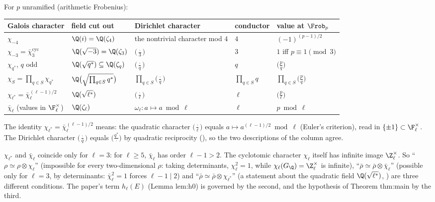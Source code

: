 \begin{example}\label{ex:ant:characters}
For $p$ unramified (arithmetic Frobenius):
\begin{center}\footnotesize\setlength{\tabcolsep}{3pt}
\begin{tabular}{lllll}
\toprule
Galois character & field cut out & Dirichlet character & conductor & value at $\Frob_p$\\
\midrule
$\chi_{-4}$ & $\Q(i)=\Q(\zeta_4)$ & the nontrivial character mod $4$ & $4$ & $(-1)^{(p-1)/2}$\\
$\chi_{-3}=\bar\chi_3^{\mathrm{cyc}}$ & $\Q(\sqrt{-3})=\Q(\zeta_3)$ & $\bigl(\frac\cdot3\bigr)$ & $3$ & $1$ iff $p\equiv1\pmod3$\\
$\chi_{q^*}$, $q$ odd & $\Q(\sqrt{q^*})\subseteq\Q(\zeta_q)$ & $\bigl(\frac\cdot q\bigr)$ & $q$ & $\bigl(\frac pq\bigr)$\\
$\chi_S=\prod_{q\in S}\chi_{q^*}$ & $\Q\bigl(\sqrt{\prod_{q\in S}q^*}\bigr)$ & $\prod_{q\in S}\bigl(\frac\cdot q\bigr)$ & $\prod_{q\in S}q$ & $\prod_{q\in S}\bigl(\frac pq\bigr)$\\
$\chi_{\ell^*}=\bar\chi_\ell^{(\ell-1)/2}$ & $\Q(\sqrt{\ell^*})$ & $\bigl(\frac\cdot\ell\bigr)$ & $\ell$ & $\bigl(\frac p\ell\bigr)$\\
$\bar\chi_\ell$ (values in $\F_\ell^\times$) & $\Q(\zeta_\ell)$ & $\omega_\ell\colon a\mapsto a\bmod\ell$ & $\ell$ & $p\bmod\ell$\\
\bottomrule
\end{tabular}
\end{center}
The identity $\chi_{\ell^*}=\bar\chi_\ell^{(\ell-1)/2}$ means: the quadratic character $\bigl(\frac\cdot\ell\bigr)$ equals $a\mapsto a^{(\ell-1)/2}\bmod\ell$ (Euler's criterion),
read in $\{\pm1\}\subset\F_\ell^\times$. The Dirichlet character $\bigl(\frac\cdot q\bigr)$ equals $\bigl(\frac{q^*}\cdot\bigr)$ by quadratic reciprocity (), so the two
descriptions of the column agree.
\end{example}

\begin{warning}\label{warn:ant:chil}
$\chi_{\ell^*}$ and $\bar\chi_\ell$ coincide only for $\ell=3$: for $\ell\ge5$, $\bar\chi_\ell$ has order $\ell-1>2$. The cyclotomic character $\chi_\ell$ itself has
infinite image $\Z_\ell^\times$. So ``$\rho\simeq\rho\otimes\chi_\ell$'' (impossible for every two-dimensional $\rho$: taking determinants, $\chi_\ell^2=1$, while $\chi_\ell(G_\Q)=\Z_\ell^\times$ is
infinite), ``$\bar\rho\simeq\bar\rho\otimes\bar\chi_\ell$'' (possible only for $\ell=3$, by determinants: $\bar\chi_\ell^2=1$ forces $\ell-1\mid2$) and ``$\bar\rho\simeq\bar\rho\otimes\chi_{\ell^*}$'' (a statement about the quadratic field $\Q(\sqrt{\ell^*})$,
) are three different conditions. The paper's term $h_\ell(E)$ (Lemma lem:h0) is governed by the second, and the hypothesis of
Theorem thm:main by the third.
\end{warning}

